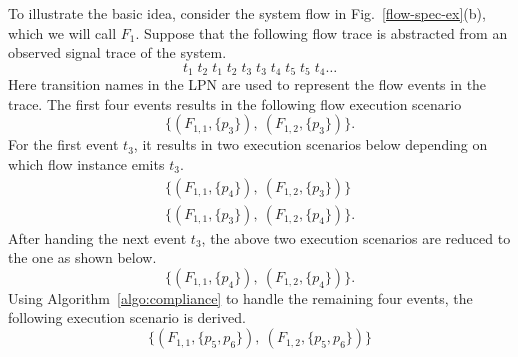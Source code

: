 \documentclass[conference]{IEEEtran}
\begin{document}
To illustrate the basic idea, consider the system flow in
Fig.~\ref{flow-spec-ex}(b), which we will call $F_1$.
Suppose that the following flow trace is abstracted from an
observed signal trace of the system.
\[
	t_1\;t_2\;t_1\;t_2\;t_3\;t_3\;t_4\;t_5\;t_5\;t_4\ldots
\]  
Here transition names in the LPN are used to represent the 
flow events in the trace.  The first four events results in
the following flow execution scenario
\[
	\{(F_{1,1}, \{p_3\}),~(F_{1,2}, \{p_3\})\}.
\]
For the first event $t_3$, it results in two execution scenarios 
below depending on which flow instance emits $t_3$.
\[
\begin{array}{l}
	\{(F_{1,1}, \{p_4\}),~(F_{1,2}, \{p_3\})\} \\
	\{(F_{1,1}, \{p_3\}),~(F_{1,2}, \{p_4\})\}.
\end{array}
\]
After handing the next event $t_3$, the above two execution scenarios
are reduced to the one as shown below.
\[
	\{(F_{1,1}, \{p_4\}),~(F_{1,2}, \{p_4\})\}.
\]
Using Algorithm~\ref{algo:compliance} to handle the
remaining four events, the following execution scenario is
derived.
\[
	\{(F_{1,1}, \{p_5, p_6\}),~(F_{1,2}, \{p_5, p_6\})\}
\]



\end{document}
